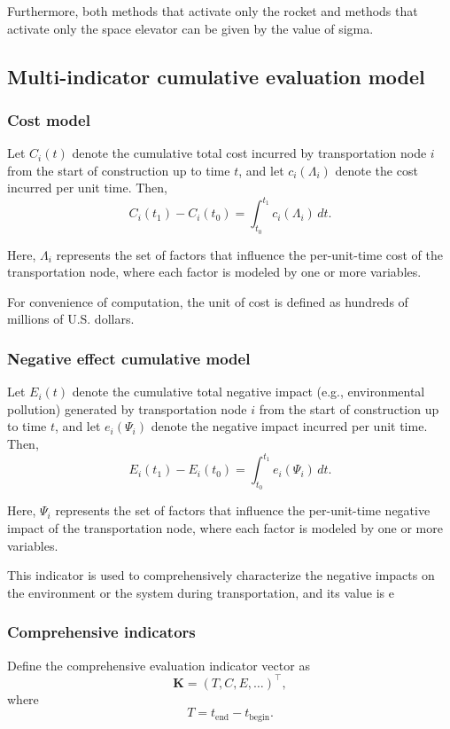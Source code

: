 \documentclass[12pt]{article}
\begin{document}
Furthermore, both methods that activate only the rocket and methods that activate only the space elevator can be given by the value of sigma.

\subsection{Multi-indicator cumulative evaluation model}

\subsubsection{Cost model}
Let $C_i(t)$ denote the cumulative total cost incurred by transportation node $i$ from the start of construction up to time $t$, and let $c_i(\Lambda_i)$ denote the cost incurred per unit time. Then,
\[
C_i(t_1) - C_i(t_0) = \int_{t_0}^{t_1} c_i(\Lambda_i)\, dt .
\]

Here, $\Lambda_i$ represents the set of factors that influence the per-unit-time cost of the transportation node, where each factor is modeled by one or more variables.

For convenience of computation, the unit of cost is defined as hundreds of millions of U.S. dollars.

\subsubsection{Negative effect cumulative model}
Let $E_i(t)$ denote the cumulative total negative impact (e.g., environmental pollution) generated by transportation node $i$ from the start of construction up to time $t$, and let $e_i(\Psi_i)$ denote the negative impact incurred per unit time. Then,
\[
E_i(t_1) - E_i(t_0) = \int_{t_0}^{t_1} e_i(\Psi_i)\, dt .
\]

Here, $\Psi_i$ represents the set of factors that influence the per-unit-time negative impact of the transportation node, where each factor is modeled by one or more variables.

This indicator is used to comprehensively characterize the negative impacts on the environment or the system during transportation, and its value is e

\subsubsection{Comprehensive indicators}
Define the comprehensive evaluation indicator vector as
\[
\boldsymbol{K} = ( T, C, E, \ldots )^\top ,
\]
where
\[
T = t_{\text{end}} - t_{\text{begin}} .
\]
\end{document}
